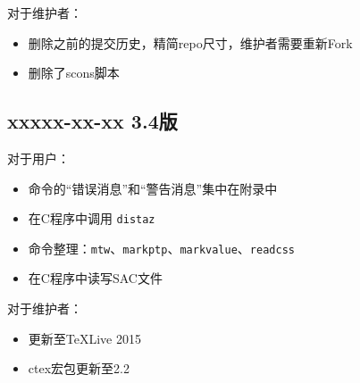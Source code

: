 对于维护者：
\begin{itemize}
\item 删除之前的提交历史，精简repo尺寸，维护者需要重新Fork
\item 删除了scons脚本
\end{itemize}

\subsection*{xxxxx-xx-xx 3.4版}
对于用户：
\begin{itemize}
\item 命令的``错误消息''和``警告消息''集中在附录中
\item 在C程序中调用 \verb+distaz+
\item 命令整理：\verb+mtw+、\verb+markptp+、\verb+markvalue+、\verb+readcss+
\item 在C程序中读写SAC文件
\end{itemize}

对于维护者：
\begin{itemize}
\item 更新至TeXLive 2015
\item ctex宏包更新至2.2
\end{itemize}
